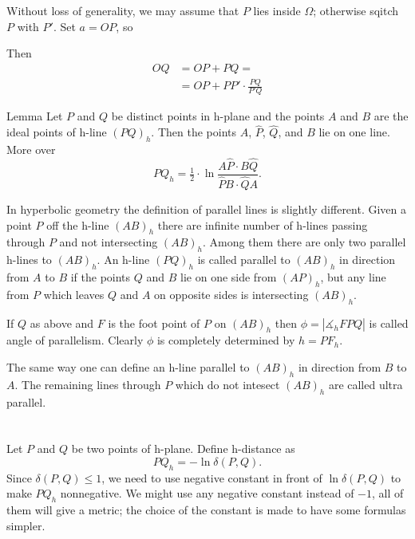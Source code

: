 {Without loss of generality, we may assume that $P$ lies inside $\Omega$;
otherwise sqitch $P$ with $P'$.
Set $a=OP$, so

Then 
\begin{align*}
OQ&=OP+PQ=
\\
&=OP+PP'\cdot \frac{PQ}{P'Q}
\end{align*}


\qeds



\begin{thm}{Lemma}
Let $P$ and $Q$ be distinct points in h-plane and the points $A$ and $B$ are the ideal points of h-line $(PQ)_h$.
Then the points $A$, $\hat P$, $\hat Q$, and $B$ lie on one line.
More over 
$$PQ_h=\tfrac12\cdot\ln\frac{A\hat P\cdot B\hat Q}{\hat PB\cdot \hat QA}.$$
\end{thm}

 
 
 
 
 
 
 
 
 
 In hyperbolic geometry the definition of parallel lines is slightly different.
Given a point $P$ off the h-line $(AB)_h$ 
there are infinite number of h-lines passing through $P$ and not intersecting $(AB)_h$. 
Among them there are only two parallel h-lines to $(AB)_h$. 
An h-line $(PQ)_h$ is called parallel to $(AB)_h$
in direction from $A$ to $B$ if the points $Q$ and $B$ lie on one side from $(AP)_h$, but any line from $P$ which leaves $Q$ and $A$ on opposite sides is intersecting $(AB)_h$.

If $Q$ as above and $F$ is the foot point of $P$ on $(AB)_h$ then $\phi=|\measuredangle_h FPQ|$ is called angle of parallelism.
Clearly $\phi$ is completely determined by $h=PF_h$.

The same way one can define an h-line parallel to $(AB)_h$
in direction from $B$ to $A$.
The remaining lines through $P$ which do not intesect $(AB)_h$ are called ultra parallel.












\section{}

Let $P$ and $Q$ be two points of h-plane.
Define h-distance  as 
$$PQ_h=-\ln\delta(P,Q).$$
Since $\delta(P,Q)\le 1$, we need to use negative constant in front of $\ln\delta(P,Q)$ to make $PQ_h$ nonnegative.
We might use any negative constant instead of $-1$, all of them will give a metric; the choice of the constant is made to have some formulas simpler.


}
